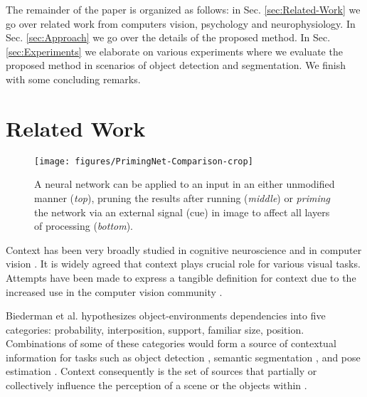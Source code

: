 \documentclass[10pt,letterpaper,twocolumn]{article}
\begin{document}
The remainder of the paper is organized as follows: in Sec. \ref{sec:Related-Work}
we go over related work from computers vision, psychology and neurophysiology.
In Sec. \ref{sec:Approach} we go over the details of the proposed
method. In Sec. \ref{sec:Experiments} we elaborate on various experiments
where we evaluate the proposed method in scenarios of object detection
and segmentation. We finish with some concluding remarks. 

\section{Related Work\label{sec:Related-Work}}

\begin{figure}
\texttt{[image: figures/PrimingNet-Comparison-crop]}

\caption{\label{fig:comparison}A neural network can be applied to an input
in an either unmodified manner (\emph{top}), pruning the results after
running (\emph{middle}) or \emph{priming }the network via an external
signal (cue) in image to affect all layers of processing (\emph{bottom}).}
\end{figure}

Context has been very broadly studied in cognitive neuroscience \cite{biederman1982scene,biederman1981semantics,oliva2007role,tulving1990priming,wig2005reductions,palmer1975effects,hollingworth1998does}
and in computer vision \cite{galleguillos2010context,divvala2009empirical,torralba2003context,torralba2003contextual,rabinovich2007objects,yao2012describing,murphy2004using}.
It is widely agreed \cite{shrivastava2016contextual} that context
plays crucial role for various visual tasks. Attempts have been made
to express a tangible definition for context due to the increased
use in the computer vision community \cite{torralba2003context,torralba2003contextual}
. 

Biederman et al. \cite{biederman1982scene} hypothesizes object-environments
dependencies into five categories: probability, interposition, support,
familiar size, position. Combinations of some of these categories
would form a source of contextual information for tasks such as object
detection \cite{torralba2003contextual,shrivastava2016contextual},
semantic segmentation \cite{harley2017segmentation}, and pose estimation
\cite{carreira2016human}. Context consequently is the set of sources
that partially or collectively influence the perception of a scene
or the objects within \cite{strat1993employing}. 
\end{document}
